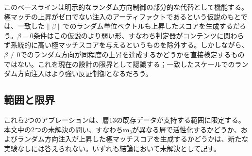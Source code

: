 このベースラインは明示的なランダム方向制御の部分的な代替として機能する。極マッチの上昇がゼロでない注入のアーティファクトであるという仮説のもとでは、一致した$\|\beta\|$でのランダム単位ベクトルも上昇したスコアを生成するだろう。$\beta=0$条件はこの仮説のより弱い形、すなわち判定器がコンテンツに関わらず系統的に高い極マッチスコアを与えるというものを除外する。しかしながら、$\beta \neq 0$でのランダム方向が同程度の上昇を達成するかどうかを直接検定するものではない。これを現在の設計の限界として認識する；一致したスケールでのランダム方向注入はより強い反証制御となるだろう。

\subsection*{範囲と限界}

これら2つのアブレーションは、層13の既存データが支持する範囲に限定する。本文中の2つの未解決の問い、すなわち$\mathbf{m}_3$が異なる層で活性化するかどうか、およびランダム方向注入が上昇した極マッチスコアを生成するかどうかは、新たな実験なしには答えられない。いずれも結論において未解決として記す。
